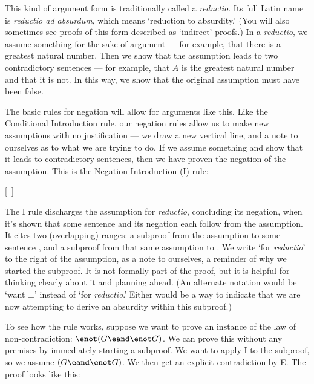 This kind of argument form is traditionally called a \emph{reductio}. Its full Latin name is \emph{reductio ad absurdum}, which means `reduction to absurdity.' (You will also sometimes see proofs of this form described as `indirect' proofs.) In a \emph{reductio}, we assume something for the sake of argument --- for example, that there is a greatest natural number. Then we show that the assumption leads to two contradictory sentences --- for example, that $A$ is the greatest natural number and that it is not. In this way, we show that the original assumption must have been false.

The basic rules for negation will allow for arguments like this. Like the Conditional Introduction rule, our negation rules allow us to make new assumptions with no justification --- we draw a new vertical line, and a note to ourselves as to what we are trying to do. If we assume something and show that it leads to contradictory sentences, then we have proven the negation of the assumption. This is the Negation Introduction ({\enot}I) rule:

\begin{ndproof}
\open
	\metaA{}
	\metaB{}
\close
{}[\ ]{\enot\metaA{}}
\end{ndproof}

The {\enot}I rule discharges the assumption for \emph{reductio}, concluding its negation, when it's shown that some sentence and its negation each follow from the assumption. It cites two (overlapping) ranges: a subproof from the assumption to some sentence \metaB{}, and a subproof from that same assumption to \enot\metaB{}. We write `for \emph{reductio}' to the right of the assumption, as a note to ourselves, a reminder of why we started the subproof. It is not formally part of the proof, but it is helpful for thinking clearly about it and planning ahead. (An alternate notation would be `want $\bot$' instead of `for \emph{reductio}.' Either would be a way to indicate that we are now attempting to derive an absurdity within this subproof.)

To see how the rule works, suppose we want to prove an instance of the law of non-contradiction: $\enot(G \eand \enot G)$. We can prove this without any premises by immediately starting a subproof. We want to apply {\enot}I to the subproof, so we assume $(G \eand \enot G)$. We then get an explicit contradiction by {\eand}E. The proof looks like this:

